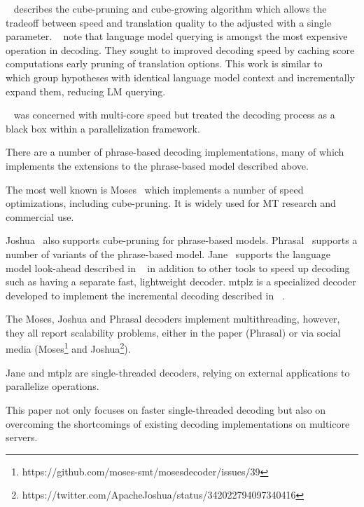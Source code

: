 \documentclass[11pt]{article}
\begin{document}
~ describes the cube-pruning and cube-growing algorithm which allows the tradeoff between speed and translation quality to the adjusted with a single parameter. ~ note that language model querying is amongst the most expensive operation in decoding. They sought to improved decoding speed by caching score computations early pruning of translation options. This work is similar to ~ which group hypotheses with identical language model context and incrementally expand them, reducing LM querying.

~ was concerned with multi-core speed but treated the decoding process as a black box within a parallelization framework.

There are a number of phrase-based decoding implementations, many of which implements the extensions to the phrase-based model described above.

The most well known is Moses~\cite{koehn-EtAl:2007:PosterDemo} which implements a number of speed optimizations, including cube-pruning. It is widely used for MT research and commercial use. 

Joshua~\cite{Joshua-Decoder} also supports cube-pruning for phrase-based models. Phrasal~\cite{spence2014phrasal} supports a number of variants of the phrase-based model. Jane~\cite{peitz2012jane} supports the language model look-ahead described in ~ in addition to other tools to speed up decoding such as having a separate fast, lightweight decoder. mtplz is a specialized decoder developed to implement the incremental decoding described in ~.

The Moses, Joshua and Phrasal decoders implement multithreading, however, they all report scalability problems, either in the paper (Phrasal) or via social media (Moses\footnote{\scriptsize https://github.com/moses-smt/mosesdecoder/issues/39} and Joshua\footnote{\scriptsize https://twitter.com/ApacheJoshua/status/342022794097340416}).

Jane and mtplz are single-threaded decoders, relying on external applications to parallelize operations. %

This paper not only focuses on faster single-threaded decoding but also on overcoming the shortcomings of existing decoding implementations on multicore servers.
\end{document}
